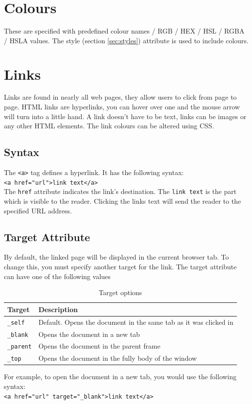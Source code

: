 \documentclass{thomasClass}
\begin{document}
\section{Colours}
These are specified with predefined colour names / RGB / HEX / HSL / RGBA / HSLA values. The style (section \ref{sec:styles}) attribute is used to include colours.

\section{Links}
Links are found in nearly all web pages, they allow users to click from page to page. HTML links are hyperlinks, you can hover over one and the mouse arrow will turn into a little hand. A link doesn't have to be text, links can be images or any other HTML elements. The link colours can be altered using CSS.
\subsection{Syntax}
The \verb|<a>| tag defines a hyperlink. It has the following syntax:\\
\verb|<a href="url">link text</a>|\\
The \verb|href| attribute indicates the link's destination. The \verb|link text| is the part which is visible to the reader. Clicking the links text will send the reader to the specified URL address.
\subsection{Target Attribute}
By default, the linked page will be displayed in the current browser tab. To change this, you must specify another target for the link. The target attribute can have one of the following values
\begin{table}[H]
    \centering
    \begin{tabularx}{0.5\textwidth}{X|X}
        Target & Description\\
        \hline
        \verb|_self| & Default. Opens the document in the same tab as it was clicked in \\
        \verb|_blank| & Opens the document in a new tab\\
        \verb|_parent| & Opens the document in the parent frame\\
        \verb|_top| & Opens the document in the fully body of the window
    \end{tabularx}
    \caption{Target options}
    \label{tab:target}
\end{table}
\noindent For example, to open the document in a new tab, you would use the following syntax:\\
\verb|<a href="url" target="_blank">link text</a>|
\end{document}

